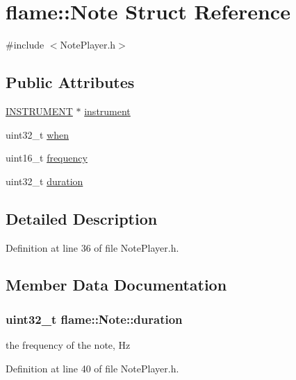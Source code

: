 \hypertarget{structflame_1_1_note}{\section{flame\-:\-:Note Struct Reference}
\label{structflame_1_1_note}
}


{\ttfamily \#include $<$Note\-Player.\-h$>$}

\subsection*{Public Attributes}
\begin{DoxyCompactItemize}
\item 
\hyperlink{namespaceflame_a7f0c5adbd1329cd2947d15e6af02dbf1}{I\-N\-S\-T\-R\-U\-M\-E\-N\-T} $\ast$ \hyperlink{structflame_1_1_note_a6fbc1cc3f50e9897899a31cb7f64e074}{instrument}
\item 
uint32\-\_\-t \hyperlink{structflame_1_1_note_ae6c2eda98121a00dec8a917d2cbd7ac0}{when}
\item 
uint16\-\_\-t \hyperlink{structflame_1_1_note_abd7e36428d825d141a957c492b686a2d}{frequency}
\item 
uint32\-\_\-t \hyperlink{structflame_1_1_note_af35bfd76f55bbc0366c8c4b699368390}{duration}
\end{DoxyCompactItemize}


\subsection{Detailed Description}


Definition at line 36 of file Note\-Player.\-h.



\subsection{Member Data Documentation}
\hypertarget{structflame_1_1_note_af35bfd76f55bbc0366c8c4b699368390}{
\subsubsection[{duration}]{\setlength{\rightskip}{0pt plus 5cm}uint32\-\_\-t flame\-::\-Note\-::duration}}\label{structflame_1_1_note_af35bfd76f55bbc0366c8c4b699368390}
the frequency of the note, Hz 

Definition at line 40 of file Note\-Player.\-h.

